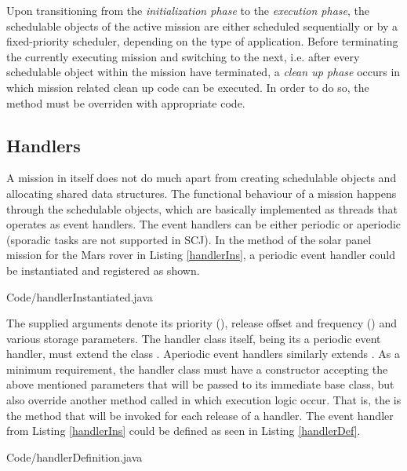 Upon transitioning from the \textit{initialization phase} to the \textit{execution phase}, the schedulable objects of the active mission are either scheduled sequentially or by a fixed-priority scheduler, depending on the type of application. Before terminating the currently executing mission and switching to the next, i.e. after every schedulable object within the mission have terminated, a \textit{clean up phase} occurs in which mission related clean up code can be executed. In order to do so, the  method must be overriden with appropriate code.

\subsection{Handlers}
\label{subsection:handlers}
A mission in itself does not do much apart from creating schedulable objects and allocating shared data structures. The functional behaviour of a mission happens through the schedulable objects, which are basically implemented as threads that operates as event handlers. The event handlers can be either periodic or aperiodic (sporadic tasks are not supported in SCJ). In the  method of the solar panel mission for the Mars rover in Listing \ref{handlerIns}, a periodic event handler could be instantiated and registered as shown.


{Code/handlerInstantiated.java}

The supplied arguments denote its priority (), release offset and frequency () and various storage parameters. The handler class itself, being its a periodic event handler, must extend the class . Aperiodic event handlers similarly extends . As a minimum requirement, the handler class must have a constructor accepting the above mentioned parameters that will be passed to its immediate base class, but also override another method called  in which execution logic occur. That is, the  is the method that will be invoked for each release of a handler. The  event handler from Listing \ref{handlerIns} could be defined as seen in Listing \ref{handlerDef}.


{Code/handlerDefinition.java}


